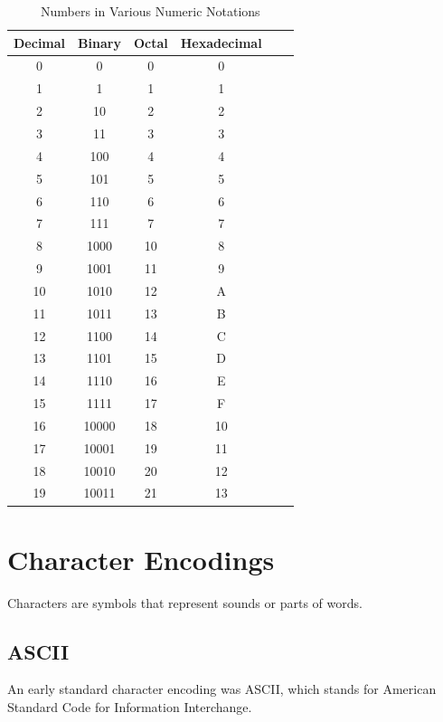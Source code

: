 \documentclass{book}
\begin{document}
\begin{table}[h!]
\centering
\begin{tabular}{||c|c|c|c|c|c||}
    \hline
    Decimal & Binary & Octal & Hexadecimal\\
    \hline\hline
     0 & 0 & 0 & 0\\
     \hline
     1 & 1 & 1 & 1\\
     \hline
     2 & 10 & 2 & 2\\
     \hline
     3 & 11 & 3 & 3\\
     \hline
     4 & 100 & 4 & 4\\
     \hline
     5 & 101 & 5 & 5\\
     \hline
     6 & 110 & 6 & 6\\
     \hline
     7 & 111 & 7 & 7\\
     \hline
     8 & 1000 & 10 & 8\\
     \hline
     9 & 1001 & 11 & 9\\
     \hline
     10 & 1010 & 12 & A\\
     \hline
     11 & 1011 & 13 & B\\
     \hline
     12 & 1100 & 14 & C\\
     \hline
     13 & 1101 & 15 & D\\
     \hline
     14 & 1110 & 16 & E\\
     \hline
     15 & 1111 & 17 & F\\
     \hline
     16 & 10000 & 18 & 10\\
     \hline
     17 & 10001 & 19 & 11\\
     \hline
     18 & 10010 & 20 & 12\\
     \hline
     19 & 10011 & 21 & 13\\
     \hline
\end{tabular}
\caption{Numbers in Various Numeric Notations}
\end{table}




\section{Character Encodings}
Characters are symbols that represent sounds or parts of words.

\subsection{ASCII}
An early standard character encoding was ASCII, which stands for
American Standard Code for Information Interchange.
\end{document}
